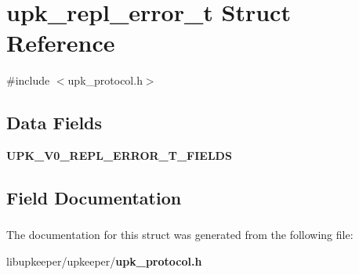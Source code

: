 \section{upk\_\-repl\_\-error\_\-t Struct Reference}
\label{structupk__repl__error__t}


{\ttfamily \#include $<$upk\_\-protocol.h$>$}

\subsection*{Data Fields}
\begin{DoxyCompactItemize}
\item 
{\bf UPK\_\-V0\_\-REPL\_\-ERROR\_\-T\_\-FIELDS}
\end{DoxyCompactItemize}


\subsection{Field Documentation}
\subsubsection[{UPK\_\-V0\_\-REPL\_\-ERROR\_\-T\_\-FIELDS}]{}\label{structupk__repl__error__t_afa660d3d6dbc44ccac6524cda82bf08d}


The documentation for this struct was generated from the following file:\begin{DoxyCompactItemize}
\item 
libupkeeper/upkeeper/{\bf upk\_\-protocol.h}\end{DoxyCompactItemize}
